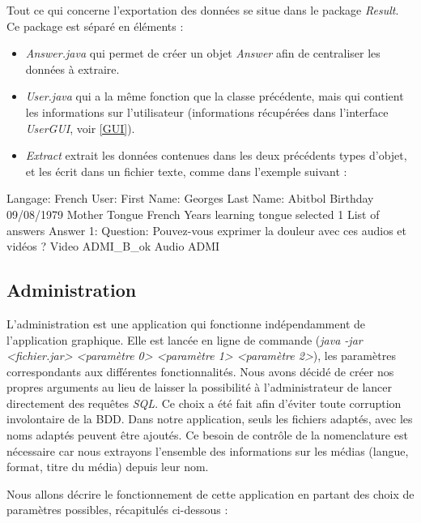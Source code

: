 Tout ce qui concerne l'exportation des données se situe dans le package \textit{Result}. Ce package est séparé en 
 éléments :
 
 \begin{itemize}
  \item \textit{Answer.java} qui permet de créer un objet \textit{Answer} afin de centraliser les données à extraire.
  \item \textit{User.java} qui a la même fonction que la classe précédente, mais qui contient les informations sur l'utilisateur (informations récupérées dans l'interface \textit{UserGUI}, voir \ref{GUI}).
  \item \textit{Extract} extrait les données contenues dans les deux précédents types d'objet, et les écrit dans un fichier texte, comme dans l'exemple suivant :
 \end{itemize}
 
 \begin{verbnobox}[\small]
  Langage:   French
  User:
      First Name:   Georges
      Last Name:   Abitbol
      Birthday   09/08/1979
      Mother Tongue   French
      Years learning tongue selected   1
  List of answers
      Answer 1:
	    Question:   Pouvez-vous exprimer la douleur avec ces audios et vidéos ?
	    Video   ADMI_B_ok
	    Audio   ADMI

 \end{verbnobox}
 
 
\subsection{Administration}\label{fonction_admi}

L'administration est une application qui fonctionne indépendamment de l'application graphique.
Elle est lancée en ligne de commande (\textit{java -jar <fichier.jar> <paramètre 0> <paramètre 1> <paramètre 2>}), les paramètres correspondants aux différentes fonctionnalités.
Nous avons décidé de créer nos propres arguments au lieu de laisser la possibilité à l'administrateur de lancer directement des requêtes \textit{SQL}. Ce choix a été fait afin d'éviter toute corruption involontaire de la BDD. Dans notre application, seuls les fichiers adaptés, avec les noms adaptés peuvent être ajoutés.
Ce besoin de contrôle de la nomenclature est nécessaire car nous extrayons l'ensemble des informations sur les médias (langue, format, titre du média) depuis leur nom.

Nous allons décrire le fonctionnement de cette application en partant des choix de paramètres possibles, récapitulés ci-dessous :

